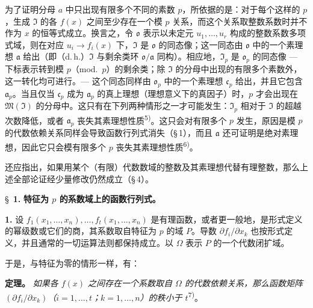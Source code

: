 为了证明分母 $a$ 中只出现有限多个不同的素数 $p$，所依据的是：对于每个这样的 $p$，生成 $\mathfrak{I}$ 的各 $f(x)$ 之间至少存在一个模 $p$ 关系，而这个关系取整数系数时并不作为 $x$ 的恒等式成立。换言之，令 $\mathfrak{o}$ 表示以未定元 $u_1,\ldots,u_r$ 构成的整数系数多项式域，则在对应 $u_i \to f_i(x)$ 下，$\mathfrak{I}$ 是 $\mathfrak{o}$ 的同态像；这一同态由 $\mathfrak{o}$ 中的一个素理想 $\mathfrak{a}$ 给出（即（d.\,h.）$\mathfrak{I}$ 与剩余类环 $\mathfrak{o}/\mathfrak{a}$ 同构）。相应地，$\mathfrak{I}_p$ 是 $\mathfrak{o}_p$ 的同态像 --- 下标表示转到模 $p$（mod.\ $p$）的剩余类；除 $\mathfrak{I}$ 的分母中出现的有限多个素数外，这一转化均可进行。--- 这个同态同样由 $\mathfrak{o}_p$ 中的一个素理想 $\mathfrak{c}_p$ 给出，并且它包含 $\mathfrak{a}_p$。当且仅当 $\mathfrak{c}_p$ 成为 $\mathfrak{a}_p$ 的真上理想（理想意义下的真因子）时，$p$ 才会出现在 $\mathfrak{M}(\mathfrak{I})$ 的分母中。这只有在下列两种情形之一才可能发生：$\mathfrak{I}_p$ 相对于 $\mathfrak{I}$ 的超越次数降低，或者 $\mathfrak{a}_p$ 丧失其素理想性质\textsuperscript{5)}。这只会对有限多个 $p$ 发生，原因是模 $p$ 的代数依赖关系同样会导致函数行列式消失（\S\,1），而且 $\mathfrak{a}$ 还可证明是绝对素理想，因此它只会模有限多个 $p$ 丧失其素理想性质\textsuperscript{6)}。

还应指出，如果用某个（有限）代数数域的整数及其素理想代替有理整数，那么上述全部论证经少量修改仍然成立（\S\,4）。

\bigskip
\S~\textbf{1.}
\textbf{特征为 $p$ 的系数域上的函数行列式。}

\smallskip

\noindent\textbf{1.}
设 $f_1(x_1,\ldots,x_n),\ldots,f_t(x_1,\ldots,x_n)$ 是有理函数，或者更一般地，是形式定义的幂级数或它们的商，其系数取自特征为 $p$ 的域 $P$。导数 $\partial f_i/\partial x_k$ 也按形式定义，并且通常的一切运算法则都保持成立。以 $\Omega$ 表示 $P$ 的一个代数闭扩域。

于是，与特征为零的情形一样，有：

\noindent\textbf{定理。}
\textit{如果各 $f(x)$ 之间存在一个系数取自 $\Omega$ 的代数依赖关系，那么函数矩阵 $(\partial f_i/\partial x_k)$（$i=1,\ldots,t$；$k=1,\ldots,n$）的秩小于 $t$}\textsuperscript{7)}。

